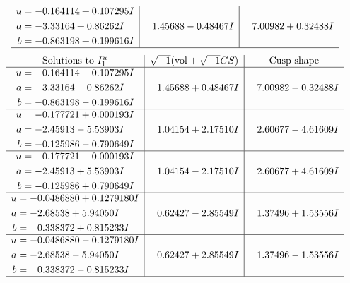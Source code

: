 \documentclass[1p]{elsarticle_modified}
\theoremstyle{definition}
\newcommand{\I}{\sqrt{-1}}
\begin{document}
$$\begin{array}{c|c|c}
\begin{aligned}
u &= -0.164114 + 0.107295 I \\
a &= -3.33164 + 0.86262 I \\
b &= -0.863198 + 0.199616 I\end{aligned}
 & \phantom{-}1.45688 - 0.48467 I & \phantom{-}7.00982 + 0.32488 I\\
 \hline 
 \end{array}$$\newpage$$\begin{array}{c|c|c}  
\text{Solutions to }I^u_{1}& \I (\text{vol} + \sqrt{-1}CS) & \text{Cusp shape}\\
 \hline 
\begin{aligned}
u &= -0.164114 - 0.107295 I \\
a &= -3.33164 - 0.86262 I \\
b &= -0.863198 - 0.199616 I\end{aligned}
 & \phantom{-}1.45688 + 0.48467 I & \phantom{-}7.00982 - 0.32488 I \\ \hline\begin{aligned}
u &= -0.177721 + 0.000193 I \\
a &= -2.45913 - 5.53903 I \\
b &= -0.125986 - 0.790649 I\end{aligned}
 & \phantom{-}1.04154 + 2.17510 I & \phantom{-}2.60677 - 4.61609 I \\ \hline\begin{aligned}
u &= -0.177721 - 0.000193 I \\
a &= -2.45913 + 5.53903 I \\
b &= -0.125986 + 0.790649 I\end{aligned}
 & \phantom{-}1.04154 - 2.17510 I & \phantom{-}2.60677 + 4.61609 I \\ \hline\begin{aligned}
u &= -0.0486880 + 0.1279180 I \\
a &= -2.68538 + 5.94050 I \\
b &= \phantom{-}0.338372 + 0.815233 I\end{aligned}
 & \phantom{-}0.62427 - 2.85549 I & \phantom{-}1.37496 + 1.53556 I \\ \hline\begin{aligned}
u &= -0.0486880 - 0.1279180 I \\
a &= -2.68538 - 5.94050 I \\
b &= \phantom{-}0.338372 - 0.815233 I\end{aligned}
 & \phantom{-}0.62427 + 2.85549 I & \phantom{-}1.37496 - 1.53556 I\\
 \hline 
 \end{array}$$\newpage\newpage\renewcommand{\arraystretch}{1}
\end{document}
